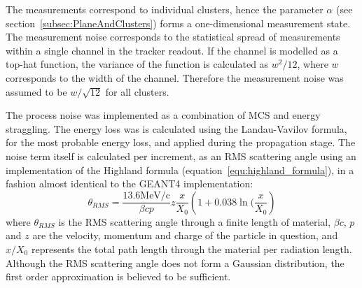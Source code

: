     The measurements correspond to individual clusters, hence the parameter $\alpha$ (see section~\ref{subsec:PlaneAndClusters}) forms a one-dimensional measurement state. The measurement noise corresponds to the statistical spread of measurements within a single channel in the tracker readout. If the channel is modelled as a top-hat function, the variance of the function is calculated as $w^2/12$, where $w$ corresponds to the width of the channel. Therefore the measurement noise was assumed to be $w/\sqrt{12}$ for all clusters.

    The process noise was implemented as a combination of MCS and energy straggling. The energy loss  was is calculated using the Landau-Vavilov formula, for the most probable energy loss, and applied during the propagation stage. The noise term itself is calculated per increment, as an RMS scattering angle using an implementation of the Highland formula (equation~\ref{equ:highland_formula}), in a fashion almost identical to the GEANT4 implementation:
    \begin{equation}
      \theta_{RMS} = \frac{13.6\textrm{MeV/c}}{\beta c p} z \frac{x}{X_0}\left( 1 + 0.038 \ln(\frac{x}{X_0} \right)
      \label{equ:highland_formula}
    \end{equation}
    where $\theta_{RMS}$ is the RMS scattering angle through a finite length of material, $\beta c$, $p$ and $z$ are the velocity, momentum and charge of the particle in question, and $x/X_0$ represents the total path length through the material per radiation length. Although the RMS scattering angle does not form a Gaussian distribution, the first order approximation is believed to be sufficient.








  
